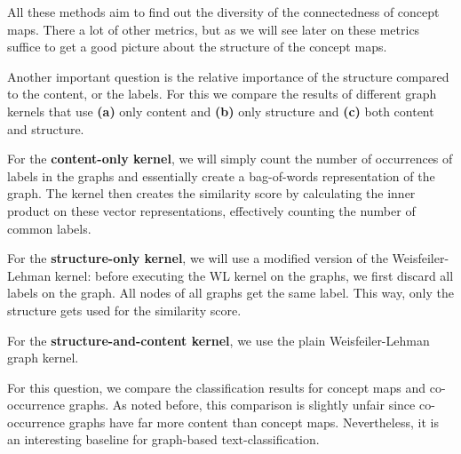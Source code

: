 All these methods aim to find out the diversity of the connectedness of concept maps. There a lot of other metrics, but as we will see later on these metrics suffice to get a good picture about the structure of the concept maps.

Another important question is the relative importance of the structure compared to the content, or the labels.
For this we compare the results of different graph kernels that use \textbf{(a)} only content and \textbf{(b)} only structure and \textbf{(c)} both content and structure.

For the \textbf{content-only kernel}, we will simply count the number of occurrences of labels in the graphs and essentially create a bag-of-words representation of the graph. The kernel then creates the similarity score by calculating the inner product on these vector representations, effectively counting the number of common labels.

For the \textbf{structure-only kernel}, we will use a modified version of the Weisfeiler-Lehman kernel: before executing the WL kernel on the graphs, we first discard all labels on the graph. All nodes of all graphs get the same label. This way, only the structure gets used for the similarity score.

For the \textbf{structure-and-content kernel}, we use the plain Weisfeiler-Lehman graph kernel. 


For this question, we compare the classification results for concept maps and co-occurrence graphs. As noted before, this comparison is slightly unfair since co-occurrence graphs have far more content than concept maps.
Nevertheless, it is an interesting baseline for graph-based text-classification.

